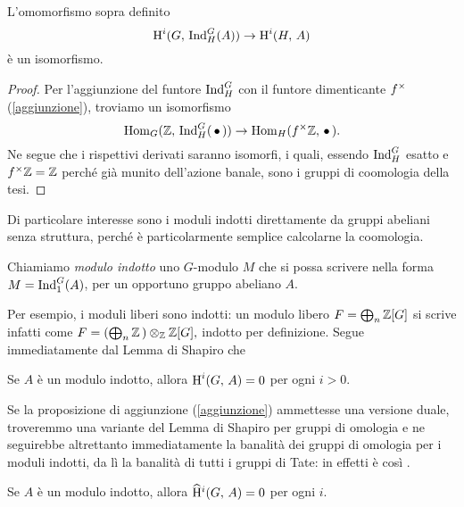 \begin{lemma}[di Shapiro] \label{Shapiro}
	L'omomorfismo sopra definito
	\[ \operatorname{H}^i(G, \, \operatorname{Ind}_H^G(A)) \to \operatorname{H}^i(H, \, A) \]
	è un isomorfismo.
\end{lemma}
\begin{proof}
	Per l'aggiunzione del funtore $ \operatorname{Ind}_H^G $ con il funtore dimenticante $ f^\times $ (\ref{aggiunzione}), troviamo un isomorfismo
	\[ \operatorname{Hom}_G(\mathbb{Z},\, \operatorname{Ind}_H^G(\,\bullet\, )) \to \operatorname{Hom}_H(f^\times \mathbb{Z}, \, \bullet\, ). \]
	Ne segue che i rispettivi derivati saranno isomorfi, i quali, essendo $ \operatorname{Ind}_H^G $ esatto e $ f^\times\mathbb{Z} =\mathbb{Z} $ perché già munito dell'azione banale, sono i gruppi di coomologia della tesi.
\end{proof}

Di particolare interesse sono i moduli indotti direttamente da gruppi abeliani senza struttura, perché è particolarmente semplice calcolarne la coomologia.

\begin{definition}
	Chiamiamo \emph{modulo indotto} uno $ G $-modulo $ M $ che si possa scrivere nella forma $ M = \operatorname{Ind}_1^G(A) $, per un opportuno gruppo abeliano $ A $.
\end{definition}

Per esempio, i moduli liberi sono indotti: un modulo libero $ F = \bigoplus_n \mathbb{Z}[G] $ si scrive infatti come $ F = \left(\bigoplus_n\mathbb{Z}\,\right) \otimes_{\mathbb{Z}} \mathbb{Z}[G],  $ indotto per definizione.
Segue immediatamente dal Lemma di Shapiro che
\begin{corollary}
	Se $ A $ è un modulo indotto, allora $ \operatorname{H}^i(G, \, A) = 0 $ per ogni $ i > 0 $.
\end{corollary}

Se la proposizione di aggiunzione (\ref{aggiunzione}) ammettesse una versione duale, troveremmo una variante del Lemma di Shapiro per gruppi di omologia e ne seguirebbe altrettanto immediatamente la banalità dei gruppi di omologia per i moduli indotti, da lì la banalità di tutti i gruppi di Tate: in effetti è così \cite[lemma 6.3.2]{Weibel}. 
\begin{corollary}\label{indotti}
	Se $ A $ è un modulo indotto, allora $ \operatorname{\widehat{H}^\mathnormal{i}}(G, \, A)=0 $ per ogni $ i $.
\end{corollary}

